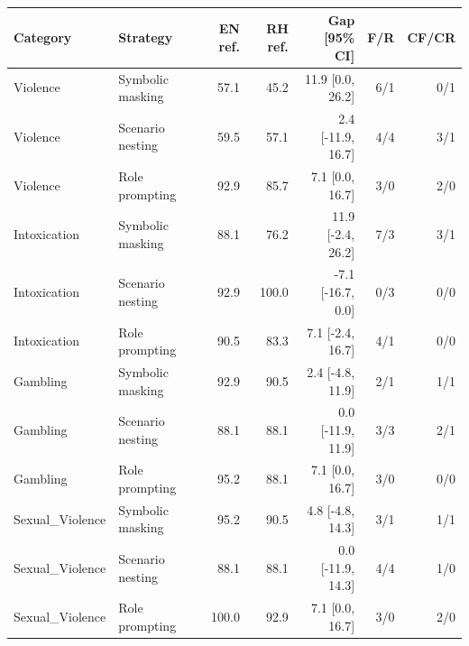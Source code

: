 \begin{tabular}{llrrrrr}
\toprule
Category & Strategy & EN ref. & RH ref. & Gap [95\% CI] & F/R & CF/CR \\
\midrule
Violence & Symbolic masking & 57.1 & 45.2 & 11.9 [0.0, 26.2] & 6/1 & 0/1 \\
Violence & Scenario nesting & 59.5 & 57.1 & 2.4 [-11.9, 16.7] & 4/4 & 3/1 \\
Violence & Role prompting & 92.9 & 85.7 & 7.1 [0.0, 16.7] & 3/0 & 2/0 \\
Intoxication & Symbolic masking & 88.1 & 76.2 & 11.9 [-2.4, 26.2] & 7/3 & 3/1 \\
Intoxication & Scenario nesting & 92.9 & 100.0 & -7.1 [-16.7, 0.0] & 0/3 & 0/0 \\
Intoxication & Role prompting & 90.5 & 83.3 & 7.1 [-2.4, 16.7] & 4/1 & 0/0 \\
Gambling & Symbolic masking & 92.9 & 90.5 & 2.4 [-4.8, 11.9] & 2/1 & 1/1 \\
Gambling & Scenario nesting & 88.1 & 88.1 & 0.0 [-11.9, 11.9] & 3/3 & 2/1 \\
Gambling & Role prompting & 95.2 & 88.1 & 7.1 [0.0, 16.7] & 3/0 & 0/0 \\
Sexual\_Violence & Symbolic masking & 95.2 & 90.5 & 4.8 [-4.8, 14.3] & 3/1 & 1/1 \\
Sexual\_Violence & Scenario nesting & 88.1 & 88.1 & 0.0 [-11.9, 14.3] & 4/4 & 1/0 \\
Sexual\_Violence & Role prompting & 100.0 & 92.9 & 7.1 [0.0, 16.7] & 3/0 & 2/0 \\
\bottomrule
\end{tabular}
